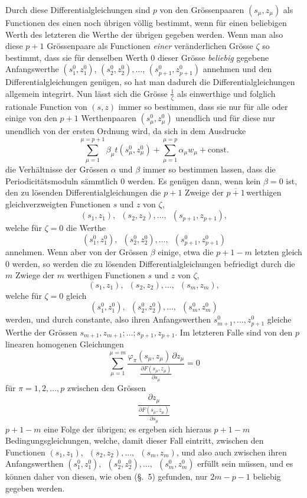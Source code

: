 \documentclass[a4paper,12pt,leqno]{article}
\begin{document}
Durch diese Differentialgleichungen sind $p$ von den
Gr\"{o}ssenpaaren $(s_\mu, z_\mu)$ als Functionen des einen noch
\"{u}brigen v\"{o}llig bestimmt, wenn f\"{u}r einen beliebigen
Werth des letzteren die Werthe der \"{u}brigen gegeben werden.
Wenn man also diese $p + 1$ Gr\"{o}ssenpaare als Functionen
\emph{einer} ver\"{a}nderlichen Gr\"{o}sse $\zeta$ so bestimmt,
dass sie f\"{u}r denselben Werth $0$ dieser Gr\"{o}sse
\emph{beliebig} gegebene Anfangswerthe
$(s_1^0, z_1^0)$, $(s_2^0, z_2^0),\ldots$, $(s_{p+1}^0, z_{p+1}^0)$
annehmen und den Differentialgleichungen gen\"{u}gen, so hat man
dadurch die Differentialgleichungen allgemein integrirt.  Nun
l\"{a}sst sich die Gr\"{o}sse
$\displaystyle\frac{1}{\zeta}$
als einwerthige und folglich rationale Function von $(s, z)$
immer so bestimmen, dass sie nur f\"{u}r alle oder einige von den
$p + 1$ Werthenpaaren $(s_\mu^0, z_\mu^0)$ unendlich und f\"{u}r
diese nur unendlich von der ersten Ordnung wird, da sich in dem
Ausdrucke
\[      \sum_{\mu=1}^{\mu = p + 1} \beta_\mu  t (s_\mu^0, z_\mu^0)
      + \sum_{\mu=1}^{\mu = p}     \alpha_\mu w_\mu
      + \mbox{const.} \]
die Verh\"{a}ltnisse der Gr\"{o}ssen $\alpha$ und $\beta$ immer
so bestimmen lassen, dass die Periodicit\"{a}tsmoduln
s\"{a}mmtlich $0$ werden.  Es gen\"{u}gen dann, wenn kein $\beta
= 0$ ist, den zu l\"{o}senden Differentialgleichungen die $p + 1$
Zweige der $\overline{p + 1} \,$\-werthigen gleichverzweigten Functionen $s$
und $z$ von $\zeta$,
\[ (s_1, z_1),\enspace
   (s_2, z_2),\ldots,\enspace
   (s_{p+1}, z_{p+1}),\]
welche f\"{u}r $\zeta = 0$ die Werthe
\[ (s_1^0, z_1^0),\enspace
   (s_2^0, z_2^0),\ldots,\enspace
   (s_{p+1}^0, z_{p+1}^0) \]
annehmen.  Wenn aber von der Gr\"{o}ssen $\beta$ einige, etwa die
$p + 1 - m$ letzten gleich $0$ werden, so werden die zu
l\"{o}senden Differentialgleichungen befriedigt durch die $m$
Zwiege der $m$ werthigen Functionen $s$ und $z$ von $\zeta$,
\[ (s_1, z_1),\enspace
   (s_2, z_2),\ldots,\enspace
   (s_m, z_m),\]
welche f\"{u}r $\zeta = 0$ gleich
\[ (s_1^0, z_1^0),\enspace
   (s_2^0, z_2^0),\ldots,\enspace
   (s_m^0, z_m^0) \]
werden, und durch constante, also ihren Anfangswerthen
$s_{m+1}^0,\ldots, z_{p+1}^0$ gleiche Werthe der Gr\"{o}ssen
$s_{m+1}, z_{m+1};\ldots; s_{p+1}, z_{p+1}$.  Im letzteren Falle
sind von den $p$ linearen homogenen Gleichungen
\[ \sum_{\mu = 1}^{\mu = m}
         \frac{\varphi_\pi(s_\mu, z_\mu) \, \partial z_\mu}{\displaystyle
            \frac{\partial F(s_\mu, z_\mu)}{\partial s_\mu}}
   = 0 \]
f\"{u}r $\pi = 1,2,\ldots, p$ zwischen den Gr\"{o}ssen
\[ \frac{\partial z_\mu}{\displaystyle
      \frac{\partial F(s_\mu, z_\mu)}{\partial s_\mu}} \]
$p + 1 - m$ eine Folge der \"{u}brigen; es ergeben sich hieraus
$p + 1 - m$ Bedingungsgleichungen, welche, damit dieser Fall
eintritt, zwischen den Functionen
$(s_1, z_1),\enspace (s_2, z_2),\ldots,\enspace (s_m, z_m)$,
und also auch zwischen ihren Anfangswerthen
$(s_1^0, z_1^0),\enspace (s_2^0, z_2^0),\ldots,\enspace (s_m^0, z_m^0)$
erf\"{u}llt sein m\"{u}ssen, und es k\"{o}nnen daher von diesen,
wie oben (\S.~5) gefunden, nur $2m - p - 1$ beliebig gegeben
werden.
\end{document}

